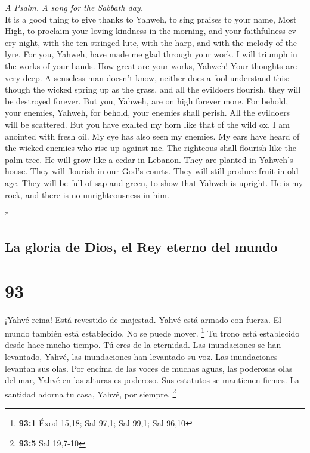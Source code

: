 \begin{paracol}{2}
\begin{otherlanguage}{english}
\emph{A Psalm. A song for the Sabbath day.}\\
 It is a good thing to give thanks to Yahweh, to sing
praises to your name, Most High,  to proclaim your loving
kindness in the morning, and your faithfulness every night,
 with the ten-stringed lute, with the harp, and with the
melody of the lyre.  For you, Yahweh, have made me glad
through your work. I will triumph in the works of your hands.
 How great are your works, Yahweh! Your thoughts are very
deep.  A senseless man doesn't know, neither does a fool
understand this:  though the wicked spring up as the
grass, and all the evildoers flourish, they will be destroyed forever.
 But you, Yahweh, are on high forever more. 
For behold, your enemies, Yahweh, for behold, your enemies shall perish.
All the evildoers will be scattered.  But you have
exalted my horn like that of the wild ox. I am anointed with fresh oil.
 My eye has also seen my enemies. My ears have heard of
the wicked enemies who rise up against me.  The righteous
shall flourish like the palm tree. He will grow like a cedar in Lebanon.
 They are planted in Yahweh's house. They will flourish
in our God's courts.  They will still produce fruit in
old age. They will be full of sap and green,  to show
that Yahweh is upright. He is my rock, and there is no unrighteousness
in him.

\end{otherlanguage}

\switchcolumn[0]*

\hypertarget{la-gloria-de-dios-el-rey-eterno-del-mundo}{%
\subsection{La gloria de Dios, el Rey eterno del
mundo}\label{la-gloria-de-dios-el-rey-eterno-del-mundo}}

\hypertarget{section-184}{%
\section{93}\label{section-184}}

 ¡Yahvé reina! Está revestido de majestad. Yahvé está
armado con fuerza. El mundo también está establecido. No se puede mover.
\footnote{\textbf{93:1} Éxod 15,18; Sal 97,1; Sal 99,1; Sal 96,10}
 Tu trono está establecido desde hace mucho tiempo. Tú
eres de la eternidad.  Las inundaciones se han levantado,
Yahvé, las inundaciones han levantado su voz. Las inundaciones levantan
sus olas.  Por encima de las voces de muchas aguas, las
poderosas olas del mar, Yahvé en las alturas es poderoso. 
Sus estatutos se mantienen firmes. La santidad adorna tu casa, Yahvé,
por siempre. \footnote{\textbf{93:5} Sal 19,7-10}


\end{paracol}
